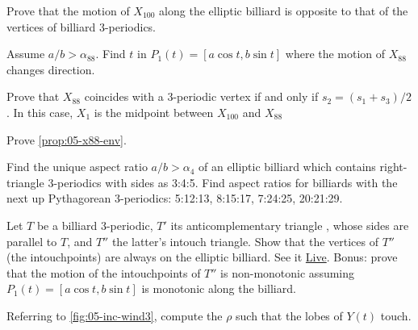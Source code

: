 \begin{exercise}
Prove that the motion of $X_{100}$ along the elliptic billiard is opposite to that of the vertices of billiard 3-periodics.
\label{exe:05-x100}
\end{exercise}

\begin{exercise}
Assume $a/b>\alpha_{88}$. Find $t$ in $P_1(t)=[a\cos{t},b\sin{t}]$ where the motion of $X_{88}$ changes direction.
\end{exercise}

\begin{exercise}
Prove that $X_{88}$ coincides with a 3-periodic vertex if and only if $s_2 = (s_1+s_3)/2$. In this case, $X_1$ is the midpoint between $X_{100}$ and $X_{88}$ 
\end{exercise}

\begin{exercise}
Prove \cref{prop:05-x88-env}.
\end{exercise}

\begin{exercise}
Find the unique aspect ratio $a/b>\alpha_4$ of an elliptic billiard which contains right-triangle 3-periodics with sides as 3:4:5. Find aspect ratios for billiards with the next up Pythagorean 3-periodics: 5:12:13, 8:15:17, 7:24:25, 20:21:29. 
\end{exercise}

\begin{exercise}
Let $T$ be a billiard 3-periodic, $T'$ its anticomplementary triangle \cite{mw}, whose sides are parallel to $T$, and $T''$ the latter's intouch triangle. Show that the vertices of $T''$ (the intouchpoints) are always on the elliptic billiard. See it \href{https://bit.ly/3vbk7yu}{Live}. Bonus: prove that the motion of the intouchpoints of $T''$ is non-monotonic assuming $P_1(t)=[a\cos{t},b\sin{t}]$ is monotonic along the billiard. 
\end{exercise}

\begin{exercise}
\label{ex:05-wind}
Referring to \cref{fig:05-inc-wind3}, compute the $\rho$ such that the lobes of $Y(t)$ touch.
\end{exercise}

